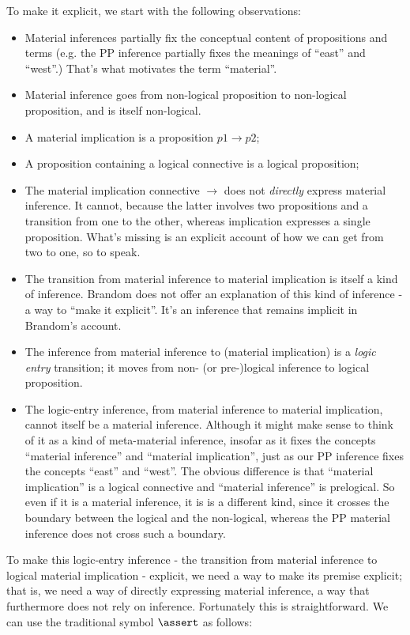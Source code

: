 \documentclass{article}
\begin{document}
To make it explicit, we start with the following observations:

\begin{itemize}
\item Material inferences partially fix the conceptual content of
  propositions and terms (e.g. the PP inference partially fixes the
  meanings of ``east'' and ``west''.) That's what motivates the term
  ``material''.
\item Material inference goes from non-logical proposition to
  non-logical proposition, and is itself non-logical.
\item A material implication is a proposition \(p1\rightarrow p2\);
\item A proposition containing a logical connective is a logical proposition;
\item The material implication connective \(\rightarrow\) does not
  \textit{directly} express material inference. It cannot, because the
  latter involves two propositions and a transition from one to the
  other, whereas implication expresses a single proposition. What's
  missing is an explicit account of how we can get from two to one, so
  to speak.
\item The transition from material inference to material implication
  is itself a kind of inference.
  Brandom does not offer an explanation of this kind of inference - a
  way to ``make it explicit''. It's an inference that remains implicit
  in Brandom's account.
\item The inference from material inference to (material implication)
  is a \textit{logic entry} transition; it moves from non- (or
  pre-)logical inference to logical proposition.
\item The logic-entry inference, from material inference to material
  implication, cannot itself be a material inference. Although it
  might make sense to think of it as a kind of meta-material
  inference, insofar as it fixes the concepts ``material inference''
  and ``material implication'', just as our PP inference fixes the
  concepts ``east'' and ``west''. The obvious difference is that
  ``material implication'' is a logical connective and ``material
  inference'' is prelogical. So even if it is a material inference, it
  is is a different kind, since it crosses the boundary between the
  logical and the non-logical, whereas the PP material inference does
  not cross such a boundary.
\end{itemize}

To make this logic-entry inference - the transition from material
inference to logical material implication - explicit, we need a way to
make its premise explicit; that is, we need a way of directly
expressing material inference, a way that furthermore does not rely on
inference. Fortunately this is straightforward. We can use the
traditional symbol \(\linfer\) as follows:
\end{document}
